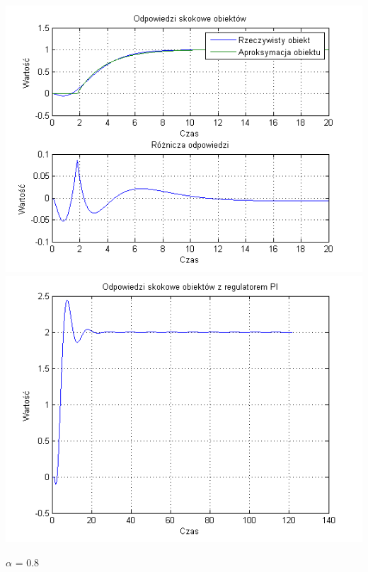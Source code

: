 \documentclass[10pt,a4paper]{article}
\begin{document}
\begin{center}
\includegraphics[scale=1]{images/jeden/skrypt_237.png}\\
\includegraphics[scale=1]{images/jeden/skrypt_238.png}\\
\end{center}
\newpage
$\alpha$ = 0.8
\end{document}
